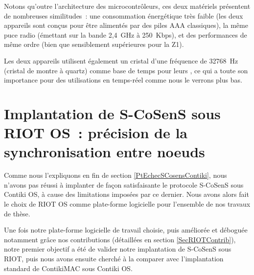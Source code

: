 \begin{description}
\end{description}

Notons qu'outre l'architecture des microcontrôleurs, ces deux matériels
présentent de nombreuses similitudes~: une consommation énergétique très
faible (les deux appareils sont conçus pour être alimentés par des piles
AAA classiques), la même puce radio (émettant sur la bande 2,4~GHz
à 250~Kbps), et des performances de même ordre (bien que sensiblement
supérieures pour la Z1).

Les deux appareils utilisent également un cristal d'une fréquence de
32768~Hz (cristal de montre à quartz) comme base de temps pour leurs
, ce qui a toute son importance pour des utilisations en
temps-réel comme nous le verrons plus bas.


\section[Implantation de S-CoSenS sous RIOT OS~: précision de la \\
         synchronisation entre noeuds]
        {Implantation de S-CoSenS sous RIOT OS~:
         précision de la synchronisation entre noeuds%
         }
\label{SecSCoSensRIOTPrecSync}

Comme nous l'expliquons en fin de section \vref{PtEchecSCosensContiki},
nous n'avons pas réussi à implanter de façon satisfaisante le protocole
S-CoSenS sous Contiki OS, à cause des limitations imposées par ce dernier.
Nous avons alors fait le choix de RIOT OS comme plate-forme logicielle
pour l'ensemble de nos travaux de thèse.

Une fois notre plate-forme logicielle de travail choisie, puis améliorée et
déboguée notamment grâce nos contributions (détaillées en section
\vref{SecRIOTContrib}), notre premier objectif a été de valider notre
implantation de S-CoSenS sous RIOT, puis nous avons ensuite cherché
à la comparer avec l'implantation standard de ContikiMAC sous Contiki OS.

